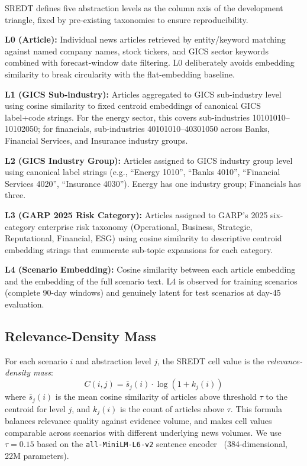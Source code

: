 \documentclass[11pt,letterpaper]{article}
\begin{document}
SREDT defines five abstraction levels as the column axis of the development triangle, fixed by pre-existing taxonomies to ensure reproducibility.

\textbf{L0 (Article):} Individual news articles retrieved by entity/keyword matching against named company names, stock tickers, and GICS sector keywords combined with forecast-window date filtering. L0 deliberately avoids embedding similarity to break circularity with the flat-embedding baseline.

\textbf{L1 (GICS Sub-industry):} Articles aggregated to GICS sub-industry level using cosine similarity to fixed centroid embeddings of canonical GICS label+code strings. For the energy sector, this covers sub-industries 10101010--10102050; for financials, sub-industries 40101010--40301050 across Banks, Financial Services, and Insurance industry groups.

\textbf{L2 (GICS Industry Group):} Articles assigned to GICS industry group level using canonical label strings (e.g., ``Energy 1010'', ``Banks 4010'', ``Financial Services 4020'', ``Insurance 4030''). Energy has one industry group; Financials has three.

\textbf{L3 (GARP 2025 Risk Category):} Articles assigned to GARP's 2025 six-category enterprise risk taxonomy (Operational, Business, Strategic, Reputational, Financial, ESG) using cosine similarity to descriptive centroid embedding strings that enumerate sub-topic expansions for each category.

\textbf{L4 (Scenario Embedding):} Cosine similarity between each article embedding and the embedding of the full scenario text. L4 is observed for training scenarios (complete 90-day windows) and genuinely latent for test scenarios at day-45 evaluation.

\subsection{Relevance-Density Mass}

For each scenario $i$ and abstraction level $j$, the SREDT cell value is the \emph{relevance-density mass}:
\begin{equation}
  C(i, j) = \bar{s}_j(i) \cdot \log(1 + k_j(i))
\end{equation}
where $\bar{s}_j(i)$ is the mean cosine similarity of articles above threshold $\tau$ to the centroid for level $j$, and $k_j(i)$ is the count of articles above $\tau$. This formula balances relevance quality against evidence volume, and makes cell values comparable across scenarios with different underlying news volumes. We use $\tau = 0.15$ based on the \texttt{all-MiniLM-L6-v2} sentence encoder~\citep{Reimers2019} (384-dimensional, 22M parameters).
\end{document}
